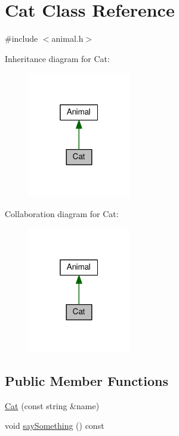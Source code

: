 \hypertarget{classCat}{}\section{Cat Class Reference}
\label{classCat}


{\ttfamily \#include $<$animal.\+h$>$}



Inheritance diagram for Cat\+:\nopagebreak
\begin{figure}[H]
\begin{center}
\leavevmode
\includegraphics[width=127pt]{classCat__inherit__graph}
\end{center}
\end{figure}


Collaboration diagram for Cat\+:\nopagebreak
\begin{figure}[H]
\begin{center}
\leavevmode
\includegraphics[width=127pt]{classCat__coll__graph}
\end{center}
\end{figure}
\subsection*{Public Member Functions}
\begin{DoxyCompactItemize}
\item 
\hyperlink{classCat_ae76478a80ba65c308a4efb251c3dc844}{Cat} (const string \&name)
\item 
void \hyperlink{classCat_a2da2143abb847a8719e302614ccb8d2e}{say\+Something} () const
\end{DoxyCompactItemize}
